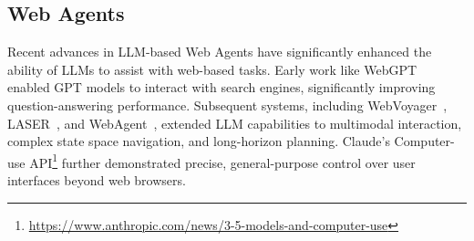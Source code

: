 \documentclass{article}
\begin{document}
\subsection{Web Agents}
Recent advances in LLM-based Web Agents have significantly enhanced the ability of LLMs to assist with web-based tasks.
Early work like WebGPT~\cite{nakanoWebGPTBrowserassistedQuestionanswering2022} enabled GPT models to interact with search engines, significantly improving question-answering performance. Subsequent systems, including WebVoyager~\cite{heWebVoyagerBuildingEndtoEnd2024}, LASER~\cite{maLASERLLMAgent2024}, and WebAgent~\cite{gurRealWorldWebAgentPlanning2023}, extended LLM capabilities to multimodal interaction, complex state space navigation, and long-horizon planning. Claude's Computer-use API\footnote{\url{https://www.anthropic.com/news/3-5-models-and-computer-use}} further demonstrated precise, general-purpose control over user interfaces beyond web browsers.

\end{document}
